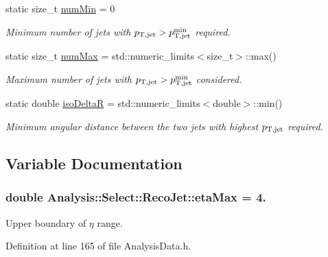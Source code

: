 \begin{DoxyCompactItemize}
static size\+\_\+t \hyperlink{namespaceAnalysis_1_1Select_1_1RecoJet_a66b9735f564115b3ac0b7a823291b689}{num\+Min} = 0
\begin{DoxyCompactList}\small\item\em Minimum number of jets with $ p_{\rm T,jet} > p_{\rm T,jet}^{\rm min} $ required. \end{DoxyCompactList}\item 
static size\+\_\+t \hyperlink{namespaceAnalysis_1_1Select_1_1RecoJet_a2ebaef4812757f83c5b2a29519e93e6d}{num\+Max} = std\+::numeric\+\_\+limits$<$size\+\_\+t$>$\+::max()
\begin{DoxyCompactList}\small\item\em Maximum number of jets with $ p_{\rm T,jet} > p_{\rm T,jet}^{\rm min} $ considered. \end{DoxyCompactList}\item 
static double \hyperlink{namespaceAnalysis_1_1Select_1_1RecoJet_a731f85162ee98774ae0a5f52aab27498}{iso\+DeltaR} = std\+::numeric\+\_\+limits$<$double$>$\+::min()
\begin{DoxyCompactList}\small\item\em Minimum angular distance between the two jets with highest $ p_{\rm T,jet} $ required. \end{DoxyCompactList}\end{DoxyCompactItemize}


\subsection{Variable Documentation}
\subsubsection[{\texorpdfstring{eta\+Max}{etaMax}}]{\setlength{\rightskip}{0pt plus 5cm}double Analysis\+::\+Select\+::\+Reco\+Jet\+::eta\+Max = 4.\hspace{0.3cm}{\ttfamily [static]}}\hypertarget{namespaceAnalysis_1_1Select_1_1RecoJet_ae6e8687dcd257798bc0849d786c4a7e0}{}\label{namespaceAnalysis_1_1Select_1_1RecoJet_ae6e8687dcd257798bc0849d786c4a7e0}


Upper boundary of $ \eta $ range. 



Definition at line 165 of file Analysis\+Data.\+h.


